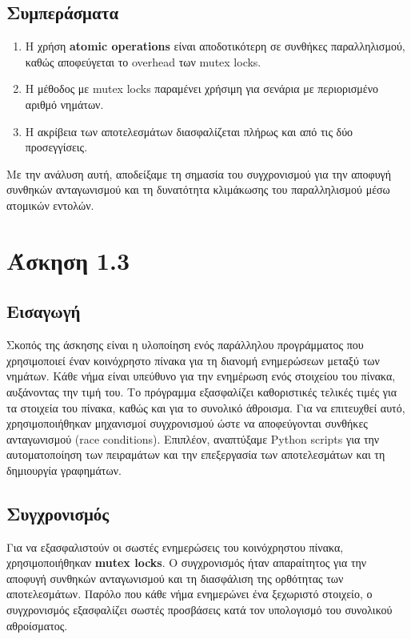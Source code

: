 \documentclass{article}
\begin{document}
\subsection*{Συμπεράσματα}
\begin{enumerate} 
    \item Η χρήση \textbf{atomic operations} είναι αποδοτικότερη σε συνθήκες παραλληλισμού, καθώς αποφεύγεται το overhead των mutex locks. 
    \item Η μέθοδος με mutex locks παραμένει χρήσιμη για σενάρια με περιορισμένο αριθμό νημάτων. 
    \item Η ακρίβεια των αποτελεσμάτων διασφαλίζεται πλήρως και από τις δύο προσεγγίσεις. 
\end{enumerate} 
Με την ανάλυση αυτή, αποδείξαμε τη σημασία του συγχρονισμού για την αποφυγή συνθηκών ανταγωνισμού και τη δυνατότητα κλιμάκωσης του παραλληλισμού μέσω ατομικών εντολών.
\section*{Άσκηση 1.3}
\subsection*{Εισαγωγή}
Σκοπός της άσκησης είναι η υλοποίηση ενός παράλληλου προγράμματος που χρησιμοποιεί έναν κοινόχρηστο πίνακα για τη διανομή ενημερώσεων μεταξύ των νημάτων. Κάθε νήμα είναι υπεύθυνο για την ενημέρωση ενός στοιχείου του πίνακα, αυξάνοντας την τιμή του. Το πρόγραμμα εξασφαλίζει καθοριστικές τελικές τιμές για τα στοιχεία του πίνακα, καθώς και για το συνολικό άθροισμα. Για να επιτευχθεί αυτό, χρησιμοποιήθηκαν μηχανισμοί συγχρονισμού ώστε να αποφεύγονται συνθήκες ανταγωνισμού (race conditions). Επιπλέον, αναπτύξαμε Python scripts για την αυτοματοποίηση των πειραμάτων και την επεξεργασία των αποτελεσμάτων και τη δημιουργία γραφημάτων.
\subsection*{Συγχρονισμός}
Για να εξασφαλιστούν οι σωστές ενημερώσεις του κοινόχρηστου πίνακα, χρησιμοποιήθηκαν \textbf{mutex locks}. Ο συγχρονισμός ήταν απαραίτητος για την αποφυγή συνθηκών ανταγωνισμού και τη διασφάλιση της ορθότητας των αποτελεσμάτων. Παρόλο που κάθε νήμα ενημερώνει ένα ξεχωριστό στοιχείο, ο συγχρονισμός εξασφαλίζει σωστές προσβάσεις κατά τον υπολογισμό του συνολικού αθροίσματος.
\end{document}
